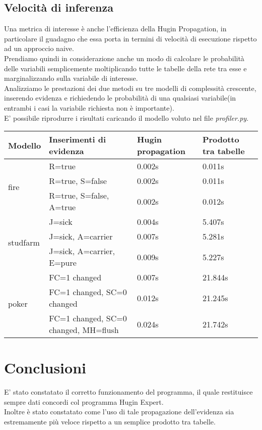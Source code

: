 \documentclass[a4paper]{article}
\begin{document}
\subsection{Velocità di inferenza}
Una metrica di interesse è anche l'efficienza della Hugin Propagation, in particolare il guadagno che essa porta in termini di velocità di esecuzione rispetto ad un approccio naive.\\
Prendiamo quindi in considerazione anche un modo di calcolare le probabilità delle variabili semplicemente moltiplicando tutte le tabelle della rete tra esse e marginalizzando sulla variabile di interesse.\\
Analizziamo le prestazioni dei due metodi su tre modelli di complessità crescente, inserendo evidenza e richiedendo le probabilità di una qualsiasi variabile(in entrambi i casi la variabile richiesta non è importante).\\
E' possibile riprodurre i risultati caricando il modello voluto nel file \emph{profiler.py}.


\begin{table}[H]
\begin{tabular}{|l|l||l|l|}\hline
   Modello  & Inserimenti di evidenza  & Hugin propagation & Prodotto tra tabelle \\ \hline
  \multirow{3}{*}{fire} & R=true & 0.002s & 0.011s \\ \cline{2-4}
  & R=true, S=false& 0.002s & 0.011s \\ \cline{2-4}
  & R=true, S=false, A=true & 0.002s & 0.012s \\ \hline
    \multirow{3}{*}{studfarm} & J=sick & 0.004s & 5.407s \\ \cline{2-4}
  & J=sick, A=carrier & 0.007s & 5.281s \\ \cline{2-4}
  & J=sick, A=carrier, E=pure & 0.009s & 5.227s \\ \hline
    \multirow{3}{*}{poker} & FC=1 changed & 0.007s & 21.844s \\ \cline{2-4}
  & FC=1 changed, SC=0 changed & 0.012s & 21.245s \\ \cline{2-4}
  & FC=1 changed, SC=0 changed, MH=flush & 0.024s & 21.742s \\ \hline
  
\end{tabular}

\end{table}

\section{Conclusioni}
E' stato constatato il corretto funzionamento del programma, il quale restituisce sempre dati concordi col programma Hugin Expert.\\
Inoltre è stato constatato come l'uso di tale propagazione dell'evidenza sia estremamente più veloce rispetto a un semplice prodotto tra tabelle.
\end{document}
